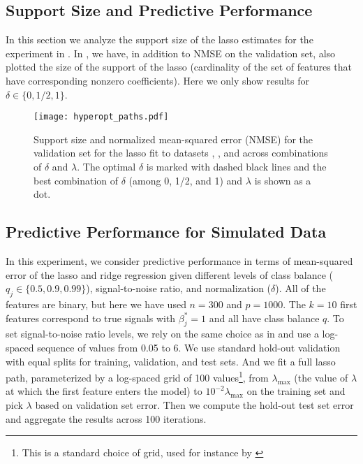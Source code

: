 \subsection{Support Size and Predictive Performance}
\label{sec:predictive-performance-support}

In this section we analyze the support size of the lasso estimates for the experiment in
. In , we have, in
addition to NMSE on the validation set, also plotted the size of the support of the lasso
(cardinality of the set of features that have corresponding nonzero coefficients). Here we
only show results for \(\delta \in \{0, 1/2, 1\}\).

\begin{figure}[htpb]
  \centering
  \texttt{[image: hyperopt\_paths.pdf]}
  \caption{%
    Support size and normalized mean-squared error (NMSE) for the validation set for the lasso
    fit to datasets , , and  across combinations of
    \(\delta\) and \(\lambda\). The optimal \(\delta\) is marked with dashed black lines and
    the best combination of \(\delta\) (among 0, 1/2, and 1) and \(\lambda\) is shown as a dot.
  }
  \label{fig:hyperopt-support}
\end{figure}

\subsection{Predictive Performance for Simulated Data}%
\label{sec:predictive-performance-simulated}

In this experiment, we consider predictive performance in terms of mean-squared error of
the lasso and ridge regression given different levels of class balance (\(q_j \in \{0.5,
0.9, 0.99\}\)), signal-to-noise ratio, and normalization (\(\delta\)). All of the features
are binary, but here we have used \(n=300\) and \(p = \num{1000}\). The \(k=10\) first
features correspond to true signals with \(\beta^*_j = 1\) and all have class balance
\(q\). To set signal-to-noise ratio levels, we rely on the same choice as in
\citet{hastie2020} and use a log-spaced sequence of values from 0.05 to 6. We use standard
hold-out validation with equal splits for training, validation, and test sets. And we fit a
full lasso path, parameterized by a log-spaced grid of 100 values\footnote{This is a
  standard choice of grid, used for instance by \citet{friedman2010}}, from
\(\lambda_\text{max}\) (the value of \(\lambda\) at which the first feature enters the
model) to \(10^{-2}\lambda_\text{max}\) on the training set and pick \(\lambda\) based on
validation set error. Then we compute the hold-out test set error and aggregate the results
across 100 iterations.

